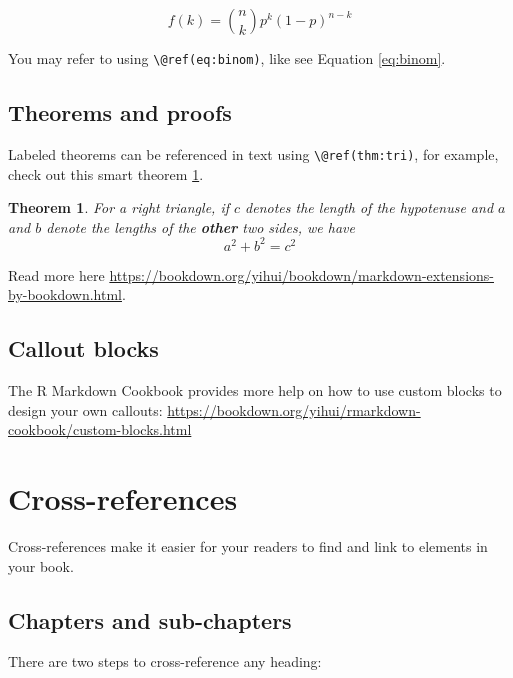 \documentclass[
]{book}
\newtheorem{theorem}{Theorem}[chapter]
\theoremstyle{definition}
\theoremstyle{definition}
\theoremstyle{definition}
\theoremstyle{definition}
\theoremstyle{remark}
\begin{document}
\begin{equation} 
  f\left(k\right) = \binom{n}{k} p^k\left(1-p\right)^{n-k}
  \label{eq:binom}
\end{equation}

You may refer to using \texttt{\textbackslash{}@ref(eq:binom)}, like see Equation \eqref{eq:binom}.

\hypertarget{theorems-and-proofs}{%
\subsection{Theorems and proofs}\label{theorems-and-proofs}}

Labeled theorems can be referenced in text using \texttt{\textbackslash{}@ref(thm:tri)}, for example, check out this smart theorem \ref{thm:tri}.

\begin{theorem}
\protect\hypertarget{thm:tri}{}\label{thm:tri}For a right triangle, if \(c\) denotes the \emph{length} of the hypotenuse
and \(a\) and \(b\) denote the lengths of the \textbf{other} two sides, we have
\[a^2 + b^2 = c^2\]
\end{theorem}

Read more here \url{https://bookdown.org/yihui/bookdown/markdown-extensions-by-bookdown.html}.

\hypertarget{callout-blocks}{%
\subsection{Callout blocks}\label{callout-blocks}}

The R Markdown Cookbook provides more help on how to use custom blocks to design your own callouts: \url{https://bookdown.org/yihui/rmarkdown-cookbook/custom-blocks.html}

\hypertarget{cross}{%
\section{Cross-references}\label{cross}}

Cross-references make it easier for your readers to find and link to elements in your book.

\hypertarget{chapters-and-sub-chapters}{%
\subsection{Chapters and sub-chapters}\label{chapters-and-sub-chapters}}

There are two steps to cross-reference any heading:
\end{document}
